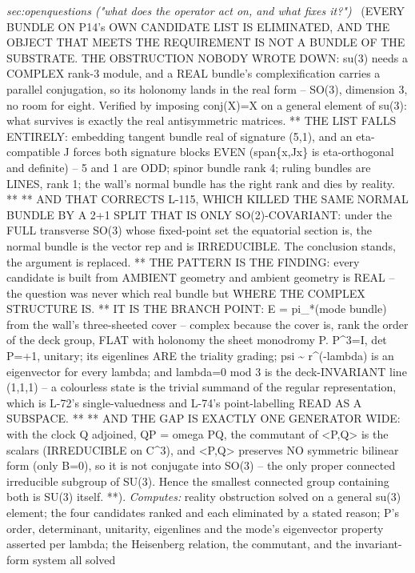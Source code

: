 \begin{description}
\textit{sec:openquestions ("what does the operator act on, and what fixes it?")} \ (EVERY BUNDLE ON P14's OWN CANDIDATE LIST IS ELIMINATED, AND THE OBJECT THAT MEETS THE REQUIREMENT IS NOT A BUNDLE OF THE SUBSTRATE. THE OBSTRUCTION NOBODY WROTE DOWN: su(3) needs a COMPLEX rank-3 module, and a REAL bundle's complexification carries a parallel conjugation, so its holonomy lands in the real form -- SO(3), dimension 3, no room for eight. Verified by imposing conj(X)=X on a general element of su(3): what survives is exactly the real antisymmetric matrices. ** THE LIST FALLS ENTIRELY: embedding tangent bundle real of signature (5,1), and an eta-compatible J forces both signature blocks EVEN (span\{x,Jx\} is eta-orthogonal and definite) -- 5 and 1 are ODD; spinor bundle rank 4; ruling bundles are LINES, rank 1; the wall's normal bundle has the right rank and dies by reality. ** ** AND THAT CORRECTS L-115, WHICH KILLED THE SAME NORMAL BUNDLE BY A 2+1 SPLIT THAT IS ONLY SO(2)-COVARIANT: under the FULL transverse SO(3) whose fixed-point set the equatorial section is, the normal bundle is the vector rep and is IRREDUCIBLE. The conclusion stands, the argument is replaced. ** THE PATTERN IS THE FINDING: every candidate is built from AMBIENT geometry and ambient geometry is REAL -- the question was never which real bundle but WHERE THE COMPLEX STRUCTURE IS. ** IT IS THE BRANCH POINT: E = pi\_*(mode bundle) from the wall's three-sheeted cover -- complex because the cover is, rank the order of the deck group, FLAT with holonomy the sheet monodromy P. P\textasciicircum{}3=I, det P=+1, unitary; its eigenlines ARE the triality grading; psi \textasciitilde{} r\textasciicircum{}(-lambda) is an eigenvector for every lambda; and lambda=0 mod 3 is the deck-INVARIANT line (1,1,1) -- a colourless state is the trivial summand of the regular representation, which is L-72's single-valuedness and L-74's point-labelling READ AS A SUBSPACE. ** ** AND THE GAP IS EXACTLY ONE GENERATOR WIDE: with the clock Q adjoined, QP = omega PQ, the commutant of <P,Q> is the scalars (IRREDUCIBLE on C\textasciicircum{}3), and <P,Q> preserves NO symmetric bilinear form (only B=0), so it is not conjugate into SO(3) -- the only proper connected irreducible subgroup of SU(3). Hence the smallest connected group containing both is SU(3) itself. **). 
\emph{Computes:} reality obstruction solved on a general su(3) element; the four candidates ranked and each eliminated by a stated reason; P's order, determinant, unitarity, eigenlines and the mode's eigenvector property asserted per lambda; the Heisenberg relation, the commutant, and the invariant-form system all solved

\end{description}
